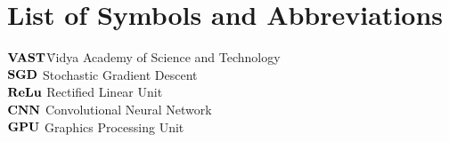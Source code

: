 %
%
%
%
%
%



\chapter*{List of Symbols and Abbreviations}




\begin{tabbing}



\hspace{1cm}\= {$ \bf VAST  $}\quad\= Vidya Academy of Science and Technology\\[5pt]

\> {$ \bf SGD  $} \> Stochastic Gradient Descent\\[5pt]

\> {$ \bf ReLu $} \>   Rectified Linear Unit\\[5pt]

\> {$ \bf CNN  $} \> Convolutional Neural Network\\[5pt]


\> {$ \bf GPU  $} \> Graphics Processing Unit\\[5pt]




\end{tabbing}
